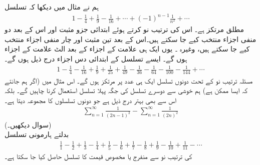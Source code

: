 ہم نے مثال  میں دیکھا کہ تسلسل
\begin{align*}
1-\frac{1}{4}+\frac{1}{9}-\frac{1}{16}+\cdots+(-1)^{n-1}\frac{1}{n^2}+\cdots
\end{align*}
مطلق مرتکز ہے۔ اس کی ترتیب نو کرتے ہوئے ابتدائی جزو مثبت اور اس  کے بعد دو منفی اجزاء منتخب کیے جا سکتے ہیں۔اس کے بعد تین مثبت اور چار منفی اجزاء  منتخب کیے جا سکتے ہیں، وغیرہ ۔ یوں ایک ہی علامت کے  اجزاء کے بعد الٹ علامت کے  اجزاء ہوں گے۔ ایسے تسلسل کے ابتدائی دس اجزاء درج ذیل ہوں گے۔
\begin{align*}
1-\frac{1}{4}-\frac{1}{16}+\frac{1}{9}+\frac{1}{25}+\frac{1}{49}-\frac{1}{36}-\frac{1}{64}-\frac{1}{100}-\frac{1}{144}+\cdots
\end{align*}
مسئلہ ترتیب نو کے تحت دونوں تسلسل ایک ہی عدد پر مرتکز ہوں گے۔ اس مثال میں (اگر ہم جانتے کہ ایسا ممکن ہے) ہم خوشی سے دوسرے تسلسل کی جگہ پہلا تسلسل استعمال کرنا چاہیں گے۔ بلکہ اس سے بھی بہتر درج ذیل ہے جو  دونوں تسلسلوں  کا مجموعہ  دیتا ہے۔
\begin{align*}
\sum_{n=1}^{\infty}\frac{1}{(2n-1)^2}-\sum_{n=1}^{\infty}\frac{1}{(2n)^2}
\end{align*}
(سوال  دیکھیں۔)
\\
بدلتے ہارمونی تسلسل
\begin{align*}
\frac{1}{1}-\frac{1}{2}+\frac{1}{3}-\frac{1}{4}+\frac{1}{5}-\frac{1}{6}+\frac{1}{7}-\frac{1}{8}+\frac{1}{9}-\frac{1}{10}+\frac{1}{11}-\cdots
\end{align*}
کی ترتیب نو سے منفرج  یا مخصوص قیمت کا تسلسل حاصل کیا جا سکتا ہے۔
